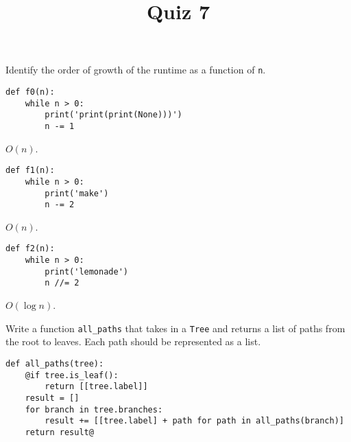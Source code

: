 \documentclass[twoside]{article}
\title{\sc Quiz 7 \solution{Solutions}}
\newcommand{\solution}[1]{{\color{red}#1}}
\begin{document}
\maketitle

\begin{enumerate}

Identify the order of growth of the runtime as a function of \lstinline{n}.
\vspace{0.1in}

\begin{lstlisting}
def f0(n):
    while n > 0:
        print('print(print(None)))')
        n -= 1
\end{lstlisting}
\solution{$O(n)$.}
~\\

\begin{lstlisting}
def f1(n):
    while n > 0:
        print('make')
        n -= 2
\end{lstlisting}
\solution{$O(n)$.}
~\\

\begin{lstlisting}
def f2(n):
    while n > 0:
        print('lemonade')
        n //= 2
\end{lstlisting}
\solution{$O(\log{n})$.}
~\\

\newpage


Write a function \lstinline{all_paths} that takes in a \lstinline{Tree} and returns a list of paths from the root to leaves. Each path should be represented as a list.

\begin{lstlisting}
def all_paths(tree):
    @if tree.is_leaf():
        return [[tree.label]]
    result = []
    for branch in tree.branches:
        result += [[tree.label] + path for path in all_paths(branch)]
    return result@
\end{lstlisting}

\end{enumerate}
\end{document}
